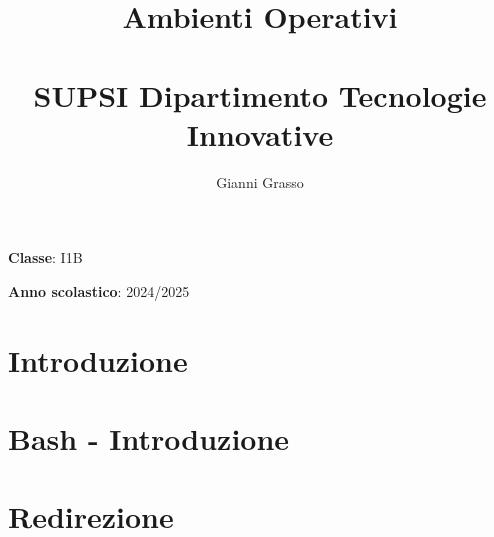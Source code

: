 \documentclass{article}
\title{
    Ambienti Operativi \\
    \phantom{}\\
    \large SUPSI Dipartimento Tecnologie Innovative
}
\author{Gianni Grasso}
\begin{document}
\maketitle
\hphantom{ }
\vspace{14.5cm}

\textbf{Classe}: I1B

\textbf{Anno scolastico}: 2024/2025
\pagebreak


\tableofcontents
\pagebreak

\section{Introduzione}

\pagebreak


\section{Bash - Introduzione}

\pagebreak

\section{Redirezione}

\pagebreak

\end{document}
